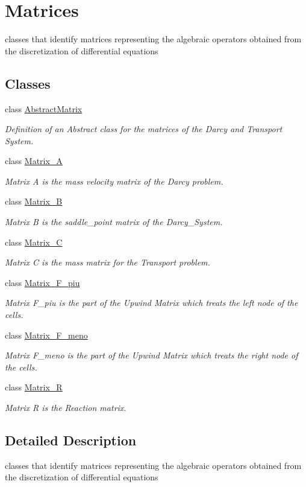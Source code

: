 \hypertarget{group__Matrices}{}\section{Matrices}
\label{group__Matrices}


classes that identify matrices representing the algebraic operators obtained from the discretization of differential equations  


\subsection*{Classes}
\begin{DoxyCompactItemize}
\item 
class \hyperlink{classAbstractMatrix}{Abstract\+Matrix}
\begin{DoxyCompactList}\small\item\em Definition of an Abstract class for the matrices of the Darcy and Transport System. \end{DoxyCompactList}\item 
class \hyperlink{classMatrix__A}{Matrix\+\_\+A}
\begin{DoxyCompactList}\small\item\em Matrix A is the mass velocity matrix of the Darcy problem. \end{DoxyCompactList}\item 
class \hyperlink{classMatrix__B}{Matrix\+\_\+B}
\begin{DoxyCompactList}\small\item\em Matrix B is the saddle\+\_\+point matrix of the Darcy\+\_\+\+System. \end{DoxyCompactList}\item 
class \hyperlink{classMatrix__C}{Matrix\+\_\+C}
\begin{DoxyCompactList}\small\item\em Matrix C is the mass matrix for the Transport problem. \end{DoxyCompactList}\item 
class \hyperlink{classMatrix__F__piu}{Matrix\+\_\+\+F\+\_\+piu}
\begin{DoxyCompactList}\small\item\em Matrix F\+\_\+piu is the part of the Upwind Matrix which treats the left node of the cells. \end{DoxyCompactList}\item 
class \hyperlink{classMatrix__F__meno}{Matrix\+\_\+\+F\+\_\+meno}
\begin{DoxyCompactList}\small\item\em Matrix F\+\_\+meno is the part of the Upwind Matrix which treats the right node of the cells. \end{DoxyCompactList}\item 
class \hyperlink{classMatrix__R}{Matrix\+\_\+R}
\begin{DoxyCompactList}\small\item\em Matrix R is the Reaction matrix. \end{DoxyCompactList}\end{DoxyCompactItemize}


\subsection{Detailed Description}
classes that identify matrices representing the algebraic operators obtained from the discretization of differential equations 

